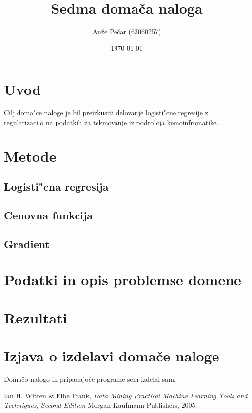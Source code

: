 \documentclass[a4paper,11pt]{article}
\title{Sedma domača naloga}
\author{Anže Pečar (63060257)}
\date{\today}
\begin{document}
\maketitle

\section{Uvod}
Cilj doma"ce naloge je bil preizkusiti delovanje logisti"cne regresije z regularizacijo na podatkih za tekmovanje iz podro"cja kemoinfromatike.
\section{Metode}
\subsection{Logisti"cna regresija}
\subsection{Cenovna funkcija}
\subsection{Gradient}
\section{Podatki in opis problemse domene}
\section{Rezultati}



\section{Izjava o izdelavi domače naloge}
Domačo nalogo in pripadajoče programe sem izdelal sam.


\begin{thebibliography}{9}

   Ian H. Witten \& Eibe Frank,
   \emph{Data Mining Practical Machine Learning Tools and Techniques, Second Edition}
   Morgan Kaufmann Publishers,  
   2005.

\end{thebibliography}
\end{document}
